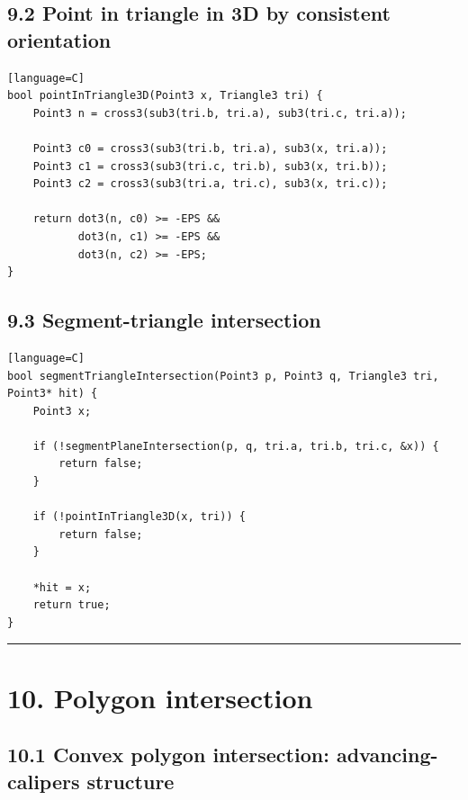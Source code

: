 \documentclass[11pt]{article}
\begin{document}
\subsection{9.2 Point in triangle in 3D by consistent
orientation}\label{point-in-triangle-in-3d-by-consistent-orientation}

\begin{verbatim}[language=C]
bool pointInTriangle3D(Point3 x, Triangle3 tri) {
    Point3 n = cross3(sub3(tri.b, tri.a), sub3(tri.c, tri.a));

    Point3 c0 = cross3(sub3(tri.b, tri.a), sub3(x, tri.a));
    Point3 c1 = cross3(sub3(tri.c, tri.b), sub3(x, tri.b));
    Point3 c2 = cross3(sub3(tri.a, tri.c), sub3(x, tri.c));

    return dot3(n, c0) >= -EPS &&
           dot3(n, c1) >= -EPS &&
           dot3(n, c2) >= -EPS;
}
\end{verbatim}

\subsection{9.3 Segment-triangle
intersection}\label{segment-triangle-intersection}

\begin{verbatim}[language=C]
bool segmentTriangleIntersection(Point3 p, Point3 q, Triangle3 tri, Point3* hit) {
    Point3 x;

    if (!segmentPlaneIntersection(p, q, tri.a, tri.b, tri.c, &x)) {
        return false;
    }

    if (!pointInTriangle3D(x, tri)) {
        return false;
    }

    *hit = x;
    return true;
}
\end{verbatim}

\begin{center}\rule{0.5\linewidth}{0.5pt}\end{center}

\section{10. Polygon intersection}\label{polygon-intersection}

\subsection{10.1 Convex polygon intersection: advancing-calipers
structure}\label{convex-polygon-intersection-advancing-calipers-structure}
\end{document}
